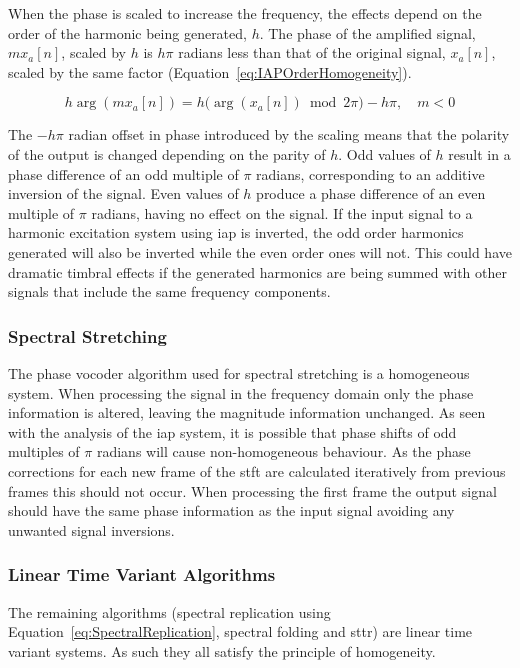 			When the phase is scaled to increase the frequency, the effects depend on the order of the harmonic
			being generated, $h$. The phase of the amplified signal, $mx_{a}[n]$, scaled by $h$ is $h\pi$
			radians less than that of the original signal, $x_{a}[n]$, scaled by the same factor
			(Equation~\ref{eq:IAPOrderHomogeneity}).

			\begin{equation}
				h\arg(mx_{a}[n]) = h \bigl( \arg(x_{a}[n]) \bmod 2\pi \bigr) - h\pi, \quad m < 0
				\label{eq:IAPOrderHomogeneity}
			\end{equation}

			The $-h\pi$ radian offset in phase introduced by the scaling means that the polarity of the output
			is changed depending on the parity of $h$. Odd values of $h$ result in a phase difference of an odd
			multiple of $\pi$ radians, corresponding to an additive inversion of the signal. Even values of $h$
			produce a phase difference of an even multiple of $\pi$ radians, having no effect on the signal. If
			the input signal to a harmonic excitation system using \acrshort{iap} is inverted, the odd order
			harmonics generated will also be inverted while the even order ones will not. This could have
			dramatic timbral effects if the generated harmonics are being summed with other signals that
			include the same frequency components.

		\subsubsection*{Spectral Stretching}
			The phase vocoder algorithm used for spectral stretching is a homogeneous system. When processing
			the signal in the frequency domain only the phase information is altered, leaving the magnitude
			information unchanged. As seen with the analysis of the \acrshort{iap} system, it is possible that
			phase shifts of odd multiples of $\pi$ radians will cause non-homogeneous behaviour. As the phase
			corrections for each new frame of the \acrshort{stft} are calculated iteratively from previous
			frames this should not occur. When processing the first frame the output signal should have the
			same phase information as the input signal avoiding any unwanted signal inversions.

		\subsubsection*{Linear Time Variant Algorithms}
			The remaining algorithms (spectral replication using Equation~\ref{eq:SpectralReplication},
			spectral folding and \acrshort{sttr}) are linear time variant systems. As such they all satisfy the
			principle of homogeneity.

